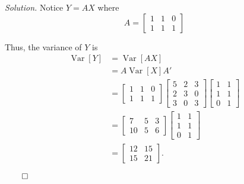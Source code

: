 \documentclass{article}
\newcommand{\Var}{\operatorname{Var}} %
\begin{document}
\textit{Solution.} Notice \(Y= AX\) where \[
A= \begin{bmatrix}
1&1&0\\
1&1&1
\end{bmatrix}
\]

Thus, the variance of \(Y\) is
\begin{align*}
\Var[Y] &= \Var[AX]\\
&= A\Var[X]A'\\
&=\begin{bmatrix}
1&1&0\\
1&1&1
\end{bmatrix}
\begin{bmatrix}
5&2&3\\
2&3&0\\
3&0&3
\end{bmatrix}
\begin{bmatrix}
1&1\\
1&1\\
0&1
\end{bmatrix} \\
&= 
\begin{bmatrix}
7 & 5&3 \\
10 & 5 & 6 
\end{bmatrix}
\begin{bmatrix}
1&1\\
1&1\\
0&1
\end{bmatrix}
\\
&= 
\begin{bmatrix}
12 & 15\\
 15 & 21
\end{bmatrix}.
\end{align*}
 \begin{flushright}
 \(\qed\)
 \end{flushright} 
\end{document}
